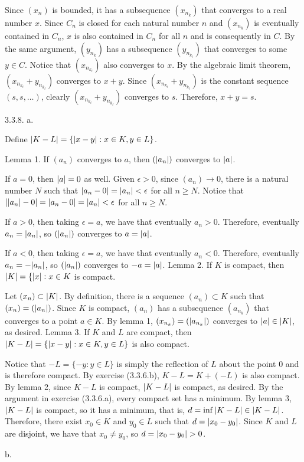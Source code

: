 Since $(x_n)$ is bounded, it has a subsequence
$(x_{n_k})$ that converges to a real number $x$.
Since $C_n$ is closed for each natural number $n$
and $(x_{n_k})$ is eventually contained in $C_n$,
$x$ is also contained in $C_n$ for all $n$
and is consequently in $C$.
By the same argument, $(y_{n_k})$ has a subsequence
$(y_{n_{k_\ell}})$ that converges to some $y \in C$.
Notice that $(x_{n_{k_\ell}})$ also converges to $x$.
By the algebraic limit theorem, $(x_{n_{k_\ell}} + y_{n_{k_\ell}})$
converges to $x + y$.
Since $(x_{n_{k_\ell}} + y_{n_{k_\ell}})$ is the constant sequence
$(s,s,\ldots)$, clearly $(x_{n_{k_\ell}} + y_{n_{k_\ell}})$
converges to $s$.
Therefore, $x + y = s$.
\bigskip
\item{3.3.8.} a.

Define $\vert K - L\vert = \{\vert x - y\vert : x \in K, y \in L\}$.

\proclaim Lemma 1. If $(a_n)$ converges to $a$,
then $(\vert a_n\vert)$ converges to $\vert a\vert$.

If $a = 0$, then $\vert a\vert = 0$ as well.
Given $\epsilon > 0$, since $(a_n) \to 0$,
there is a natural number $N$ such that
$\vert a_n - 0\vert = \vert a_n\vert < \epsilon$ for all $n \ge N$.
Notice that $\vert\vert a_n\vert - 0\vert = \vert a_n - 0\vert = \vert a_n\vert < \epsilon$
for all $n \ge N$.

If $a > 0$, then taking $\epsilon = a$, we have that eventually $a_n > 0$.
Therefore, eventually $a_n = \vert a_n\vert$,
so $(\vert a_n\vert)$ converges to $a = \vert a\vert$.

If $a < 0$, then taking $\epsilon = a$, we have that eventually $a_n < 0$.
Therefore, eventually $a_n = -\vert a_n\vert$,
so $(\vert a_n\vert)$ converges to $-a = \vert a\vert$.
\medskip
\proclaim Lemma 2. If $K$ is compact,
then $\vert K\vert = \{\vert x\vert : x \in K$ is compact.

Let $(x_n) \subset \vert K\vert$.
By definition, there is a sequence $(a_n) \subset K$
such that $(x_n) = (\vert a_n\vert)$.
Since $K$ is compact, $(a_n)$ has a subsequence $(a_{n_k})$
that converges to a point $a \in K$.
By lemma 1, $(x_{n_k}) = (\vert a_{n_k}\vert)$ converges to $\vert a\vert \in \vert K\vert$,
as desired.
\medskip
\proclaim Lemma 3. If $K$ and $L$ are compact,
then $\vert K - L\vert = \{\vert x - y\vert : x \in K, y \in L\}$ is also compact.

Notice that $-L = \{-y : y \in L\}$ is simply the reflection of $L$
about the point $0$ and is therefore compact.
By exercise (3.3.6.b), $K - L = K + (-L)$ is also compact.
By lemma 2, since $K - L$ is compact, $\vert K - L\vert$ is compact, as desired.
\medskip
By the argument in exercise (3.3.6.a), every compact set has a minimum.
By lemma 3, $\vert K - L\vert$ is compact, so it has a minimum, that is,
$d = \inf \vert K - L\vert \in \vert K - L\vert$.
Therefore, there exist $x_0 \in K$ and $y_0 \in L$
such that $d = \vert x_0 - y_0\vert$.
Since $K$ and $L$ are disjoint, we have that $x_0 \ne y_0$,
so $d = \vert x_0 - y_0\vert > 0$.
\medskip
\item{} b.


